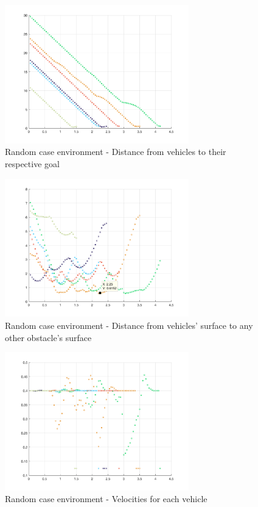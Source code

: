 \documentclass[journal]{IEEEtran}
\begin{document}
		\begin{figure}[H]
			\centering
			\includegraphics[width=8cm]{Results/Potentialfields/goal}
			\caption{Random case environment - Distance from vehicles to their respective goal}
			\label{fig:goal}
		\end{figure}
		\begin{figure}[H]
			\centering
			\includegraphics[width=8cm]{Results/Potentialfields/obst}
			\caption{Random case environment - Distance from vehicles' surface to any other obstacle's surface}
			\label{fig:obst}
		\end{figure}
	
		\begin{figure}[H]
			\centering
			\includegraphics[width=8cm]{Results/Potentialfields/vel}
			\caption{Random case environment - Velocities for each vehicle}
			\label{fig:vel}
		\end{figure}
\end{document}
